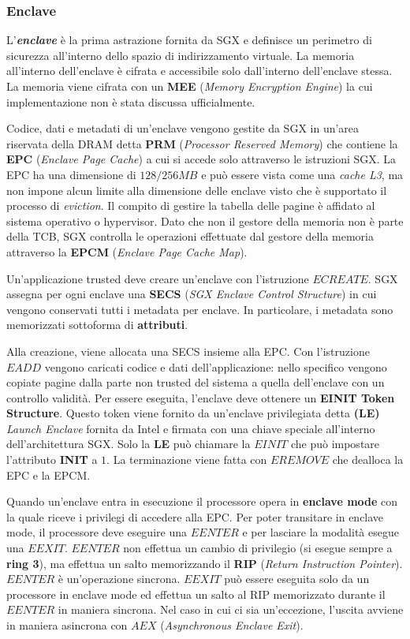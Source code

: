 \documentclass{article}
\begin{document}
\subsubsection{Enclave}\label{sec:enclave}
L'\textbf{\textit{enclave}}\cite{Costan2016} è la prima astrazione fornita da SGX e definisce un perimetro di sicurezza all'interno dello spazio di indirizzamento virtuale. La memoria all'interno dell'enclave è cifrata e accessibile solo dall'interno dell'enclave stessa. La memoria viene cifrata con un \textbf{MEE} (\textit{Memory Encryption Engine}) la cui implementazione non è stata discussa ufficialmente.

Codice, dati e metadati di un'enclave vengono gestite da SGX in un'area riservata della DRAM detta \textbf{PRM} (\textit{Processor Reserved Memory}) che contiene la \textbf{EPC} (\textit{Enclave Page Cache}) a cui si accede solo attraverso le istruzioni SGX. La EPC ha una dimensione di $128/256 MB$ e può essere vista come una \textit{cache L3}, ma non impone alcun limite alla dimensione delle enclave visto che è supportato il processo di \textit{eviction}. Il compito di gestire la tabella delle pagine è affidato al sistema operativo o hypervisor. Dato che non il gestore della memoria non è parte della TCB, SGX controlla le operazioni effettuate dal gestore della memoria attraverso la \textbf{EPCM} (\textit{Enclave Page Cache Map}).

Un'applicazione trusted deve creare un'enclave con l'istruzione $ECREATE$. SGX assegna per ogni enclave una \textbf{SECS} (\textit{SGX Enclave Control Structure}) in cui vengono conservati tutti i metadata per enclave. In particolare, i metadata sono memorizzati sottoforma di \textbf{attributi}.

Alla creazione, viene allocata una SECS insieme alla EPC. Con l'istruzione $EADD$ vengono caricati codice e dati dell'applicazione: nello specifico vengono copiate pagine dalla parte non trusted del sistema a quella dell'enclave con un controllo validità.
Per essere eseguita, l'enclave deve ottenere un \textbf{EINIT Token Structure}. Questo token viene fornito da un'enclave privilegiata detta \textbf{(LE)} \textit{Launch Enclave} fornita da Intel e firmata con una chiave speciale all'interno dell'architettura SGX. Solo la \textbf{LE} può chiamare la $EINIT$ che può impostare l'attributo \textbf{INIT} a $1$. La terminazione viene fatta con $EREMOVE$ che dealloca la EPC e la EPCM.

Quando un'enclave entra in esecuzione il processore opera in \textbf{enclave mode} con la quale riceve i privilegi di accedere alla EPC. Per poter transitare in enclave mode, il processore deve eseguire una $EENTER$ e per lasciare la modalità esegue una $EEXIT$. $EENTER$ non effettua un cambio di privilegio (si esegue sempre a \textbf{ring 3}), ma effettua un salto memorizzando il \textbf{RIP} (\textit{Return Instruction Pointer}). $EENTER$ è un'operazione sincrona. $EEXIT$ può essere eseguita solo da un processore in enclave mode ed effettua un salto al RIP memorizzato durante il $EENTER$ in maniera sincrona. Nel caso in cui ci sia un'eccezione, l'uscita avviene in maniera asincrona con $AEX$ (\textit{Asynchronous Enclave Exit}).
\end{document}
